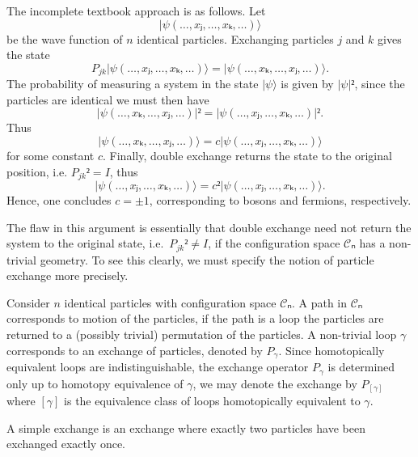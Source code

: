 \begin{example}\label{ex:crude exchange}
  The incomplete textbook approach is as follows. Let
  \begin{equation}
    |ψ(…,xⱼ,…,xₖ,…)⟩
  \end{equation}
  be the wave function of $n$ identical particles. Exchanging particles $j$ and $k$ gives the state
  \begin{equation}
    P_{jk} |ψ(…,xⱼ,…,xₖ,…)⟩ = |ψ(…,xₖ,…,xⱼ,…)⟩.
  \end{equation}
  The probability of measuring a system in the state $|ψ⟩$ is given by $|ψ|²$, since the particles are identical we must then have
  \begin{equation}
    |ψ(…,xₖ,…,xⱼ,…)|² = |ψ(…,xⱼ,…,xₖ,…)|².
  \end{equation}
  Thus
  \begin{equation}
    |ψ(…,xₖ,…,xⱼ,…)⟩ = c |ψ(…,xⱼ,…,xₖ,…)⟩
  \end{equation}
  for some constant $c$. Finally, double exchange returns the state to the original position, i.e. $P_{jk}² = I$, thus
  \begin{equation}
    |ψ(…,xⱼ,…,xₖ,…)⟩ = c² |ψ(…,xⱼ,…,xₖ,…)⟩.
  \end{equation}
  Hence, one concludes $c = ±1$, corresponding to bosons and fermions, respectively.
\end{example}

The flaw in this argument is essentially that double exchange need not return the system to the original state, i.e.\ $P_{jk}² ≠ I$, if the configuration space $𝒞ₙ$ has a non-trivial geometry. To see this clearly, we must specify the notion of particle exchange more precisely.

\begin{definition}[Exchange]
  Consider $n$ identical particles with configuration space $𝒞ₙ$. A path in $𝒞ₙ$ corresponds to motion of the particles, if the path is a loop the particles are returned to a (possibly trivial) permutation of the particles. A non-trivial loop $γ$ corresponds to an exchange of particles, denoted by $P_γ$. Since homotopically equivalent loops are indistinguishable, the exchange operator $P_γ$ is determined only up to homotopy equivalence of $γ$, we may denote the exchange by $P_{[γ]}$ where $[γ]$ is the equivalence class of loops homotopically equivalent to $γ$.
\end{definition}

\begin{definition}
  A simple exchange is an exchange where exactly two particles have been exchanged exactly once.
\end{definition}

